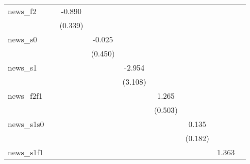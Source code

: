 {\begin{tabular}{l*{8}{c}}
\addlinespace
news\_f2     &                     &      -0.890\sym{***}&                     &                     &                     &                     &                     &                     \\
            &                     &     (0.339)         &                     &                     &                     &                     &                     &                     \\
\addlinespace
news\_s0     &                     &                     &      -0.025         &                     &                     &                     &                     &                     \\
            &                     &                     &     (0.450)         &                     &                     &                     &                     &                     \\
\addlinespace
news\_s1     &                     &                     &                     &      -2.954         &                     &                     &                     &                     \\
            &                     &                     &                     &     (3.108)         &                     &                     &                     &                     \\
\addlinespace
news\_f2f1   &                     &                     &                     &                     &       1.265\sym{**} &                     &                     &                     \\
            &                     &                     &                     &                     &     (0.503)         &                     &                     &                     \\
\addlinespace
news\_s1s0   &                     &                     &                     &                     &                     &       0.135         &                     &                     \\
            &                     &                     &                     &                     &                     &     (0.182)         &                     &                     \\
\addlinespace
news\_s1f1   &                     &                     &                     &                     &                     &                     &       1.363         &                     \\

\end{tabular}}
